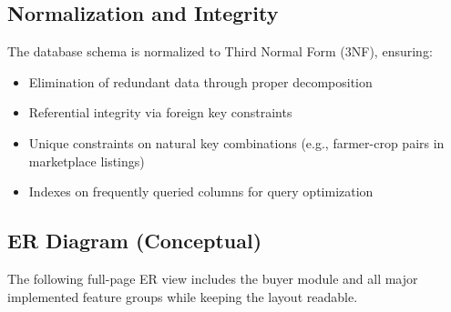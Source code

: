 \documentclass[12pt,a4paper]{report}
\begin{document}
\subsection{Normalization and Integrity}

The database schema is normalized to Third Normal Form (3NF), ensuring:
\begin{itemize}
    \item Elimination of redundant data through proper decomposition
    \item Referential integrity via foreign key constraints
    \item Unique constraints on natural key combinations (e.g., farmer-crop pairs in marketplace listings)
    \item Indexes on frequently queried columns for query optimization
\end{itemize}

\subsection{ER Diagram (Conceptual)}

The following full-page ER view includes the buyer module and all major implemented feature groups while keeping the layout readable.
\end{document}
